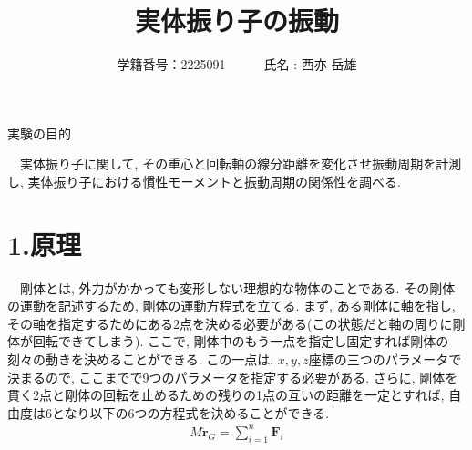 \documentclass{jlreq}
\title{実体振り子の振動}
\author{学籍番号：2225091~~~~~~氏名 : 西亦 岳雄}
\begin{document}
\maketitle


\begin{itembox}[l]{\large 実験の目的}

　実体振り子に関して, その重心と回転軸の線分距離を変化させ振動周期を計測し, 実体振り子における慣性モーメントと振動周期の関係性を調べる.

\end{itembox}


\section*{1.原理}
　剛体とは, 外力がかかっても変形しない理想的な物体のことである. その剛体の運動を記述するため, 剛体の運動方程式を立てる. まず, ある剛体に軸を指し, その軸を指定するためにある2点を決める必要がある(この状態だと軸の周りに剛体が回転できてしまう). ここで, 剛体中のもう一点を指定し固定すれば剛体の刻々の動きを決めることができる. この一点は, $x,y,z$座標の三つのパラメータで決まるので, ここまでで9つのパラメータを指定する必要がある. さらに, 剛体を貫く2点と剛体の回転を止めるための残りの1点の互いの距離を一定とすれば, 自由度は6となり以下の6つの方程式を決めることができる.
\begin{align}
    M \ddot{\bm{r}}_G = \sum_{i=1}^{n} \bm{F}_i
\end{align}
\end{document}

